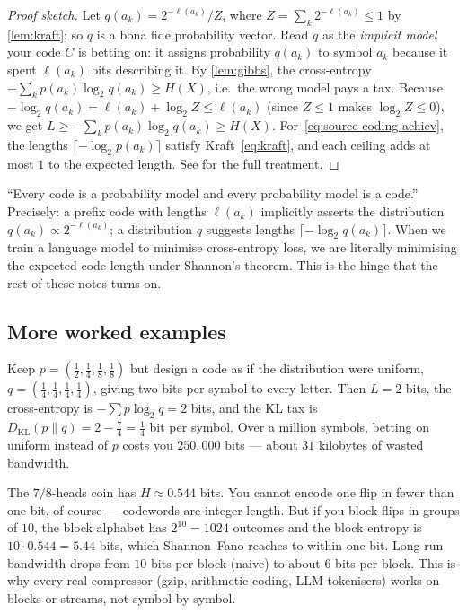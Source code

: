 \begin{proof}[Proof sketch]
Let $q(a_k) = 2^{-\ell(a_k)} / Z$, where
$Z = \sum_k 2^{-\ell(a_k)} \le 1$ by \cref{lem:kraft}; so $q$ is a
bona fide probability vector. Read $q$ as the \emph{implicit model}
your code $C$ is betting on: it assigns probability $q(a_k)$ to
symbol $a_k$ because it spent $\ell(a_k)$ bits describing it. By
\cref{lem:gibbs}, the cross-entropy $-\sum_k p(a_k) \log_2 q(a_k)
\ge H(X)$, i.e.\ the wrong model pays a tax. Because
$-\log_2 q(a_k) = \ell(a_k) + \log_2 Z \le \ell(a_k)$ (since $Z \le
1$ makes $\log_2 Z \le 0$), we get $L \ge -\sum_k p(a_k)\log_2
q(a_k) \ge H(X)$. For~\eqref{eq:source-coding-achiev}, the lengths
$\lceil -\log_2 p(a_k)\rceil$ satisfy Kraft~\eqref{eq:kraft}, and
each ceiling adds at most $1$ to the expected length. See
\citet[Ch.~5]{coverthomas2006} for the full treatment.
\end{proof}

\begin{aside}
``Every code is a probability model and every probability model is a
code.'' Precisely: a prefix code with lengths $\ell(a_k)$ implicitly
asserts the distribution $q(a_k) \propto 2^{-\ell(a_k)}$; a
distribution $q$ suggests lengths $\lceil -\log_2 q(a_k)\rceil$.
When we train a language model to minimise cross-entropy loss, we
are literally minimising the expected code length under Shannon's
theorem. This is the hinge that the rest of these notes turns on.
\end{aside}

\subsection*{More worked examples}

\begin{example}
\label{ex:h4-wrong}
Keep $p = (\tfrac12, \tfrac14, \tfrac18, \tfrac18)$ but design a code
as if the distribution were uniform, $q = (\tfrac14, \tfrac14,
\tfrac14, \tfrac14)$, giving two bits per symbol to every letter.
Then $L = 2$ bits, the cross-entropy is $-\sum p \log_2 q = 2$ bits,
and the KL tax is $D_{\mathrm{KL}}(p\|q) = 2 - \tfrac74 = \tfrac14$
bit per symbol. Over a million symbols, betting on uniform instead
of $p$ costs you $250{,}000$ bits --- about $31$ kilobytes of
wasted bandwidth.
\end{example}

\begin{example}
\label{ex:biased-coin}
The $7/8$-heads coin has $H \approx 0.544$ bits. You cannot encode
one flip in fewer than one bit, of course --- codewords are
integer-length. But if you block flips in groups of $10$, the
block alphabet has $2^{10} = 1024$ outcomes and the block entropy
is $10\cdot 0.544 = 5.44$ bits, which Shannon--Fano reaches to
within one bit. Long-run bandwidth drops from $10$ bits per block
(naive) to about $6$ bits per block. This is why every real
compressor (gzip, arithmetic coding, LLM tokenisers) works on
blocks or streams, not symbol-by-symbol.
\end{example}


